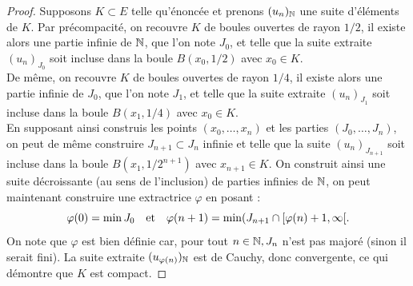 \begin{proof}
Supposons $K \subset E$ telle qu'énoncée et prenons $(u_n)_{\mathbb{N}}$ une suite d'éléments de $K$.
Par précompacité, on recouvre $K$ de boules ouvertes de rayon $1/2$, il existe alors une partie infinie de $\mathbb{N}$, que l'on note $J_0$,
et telle que la suite extraite $(u_n)_{J_0}$ soit incluse dans la boule $B(x_0, 1/2)$ avec $x_0 \in K$. \\
De même, on recouvre $K$ de boules ouvertes de rayon $1/4$, il existe alors une partie infinie de $J_0$, que l'on note $J_1$,
et telle que la suite extraite $(u_n)_{J_1}$ soit incluse dans la boule $B(x_1, 1/4)$ avec $x_0 \in K$. \\
En supposant ainsi construis les points $(x_0, \dots, x_n)$ et les parties $(J_0, \dots, J_n)$, on peut de même construire
$J_{n+1} \subset J_n$ infinie et telle que la suite $(u_n)_{J_{n+1}}$ soit incluse dans la boule $B(x_1, 1/2^{n+1})$ avec $x_{n+1} \in K$. 
On construit ainsi une suite décroissante (au sens de l'inclusion) de parties infinies de $\mathbb{N}$, 
on peut maintenant construire une extractrice $\varphi$ en posant :
\[ \varphi(0) = \min{J_0} \quad \text{et} \quad \varphi(n+1) = \min( J_{n+1} \cap [\varphi(n) + 1 , \infty [ . \]
On note que $\varphi$ est bien définie car, pour tout $n \in \mathbb{N}, J_n$ n'est pas majoré (sinon il serait fini).
La suite extraite $(u_{\varphi(n)})_{\mathbb{N}}$ est de Cauchy, donc convergente, ce qui démontre que $K$ est compact.
\end{proof}

